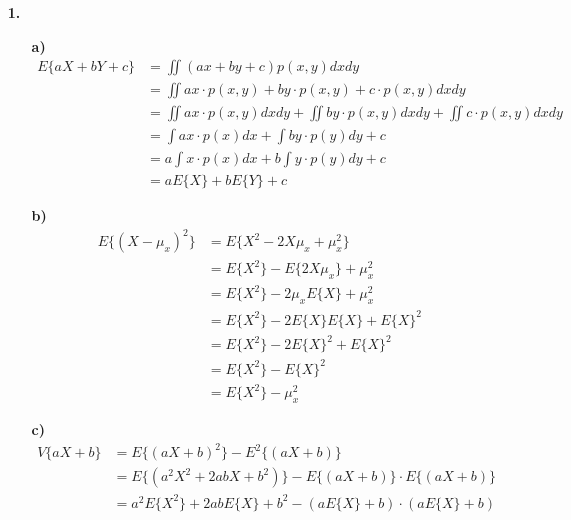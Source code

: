 \documentclass[a4paper,11pt]{article}
\author{\authorinfotitle}
\title{\titleinfo}
\date{\today}
\begin{document}
	\maketitle
	\begin{enumerate}
		\item[\textbf{1.}]
		
		\begin{enumerate}
		\item[\textbf{a)}]
		\begin{align*}
		E\lbrace aX+bY+c\rbrace &= \iint (ax+by+c)p(x,y)dxdy\\
				   &= \iint ax \cdot p(x,y) + by \cdot p(x,y) + c \cdot p(x,y) dxdy\\
				   &= \iint ax \cdot p(x,y) dxdy + \iint by \cdot p(x,y) dxdy + \iint c \cdot p(x,y) dxdy\\
				  &= \int ax \cdot p(x) dx + \int by \cdot p(y) dy +  c\\ 
				  &= a\int x \cdot p(x) dx + b\int y \cdot p(y) dy +  c\\ 
				  &= aE\lbrace X\rbrace + bE\lbrace Y\rbrace +  c
		\end{align*}
		\item[\textbf{b)}]
		\begin{align*}
		E\lbrace (X-\mu_x)^2\rbrace &= E\lbrace X^2-2X\mu_x + \mu^2_x\rbrace \\
							  		&= E\lbrace X^2\rbrace-E\lbrace 2X\mu_x \rbrace + \mu^2_x\\
							  		&= E\lbrace X^2\rbrace-2\mu_x E\lbrace X \rbrace + \mu^2_x\\				
							  		&= E\lbrace X^2\rbrace-2 E\lbrace X \rbrace E\lbrace X \rbrace + E\lbrace X \rbrace^2\\			
							  		&= E\lbrace X^2\rbrace-2 E\lbrace X \rbrace^2 + E\lbrace X \rbrace^2\\				
							  		&= E\lbrace X^2\rbrace- E\lbrace X \rbrace^2 \\					  						&= E\lbrace X^2\rbrace- \mu_x^2
		\end{align*}
		\item[\textbf{c)}]
		\begin{align*}
		V\lbrace aX + b \rbrace &= E\lbrace (aX + b)^2 \rbrace - E^2\lbrace (aX + b) \rbrace \\
		&= E\lbrace (a^2X^2 + 2abX + b^2) \rbrace - E\lbrace (aX + b) \rbrace \cdot
		E\lbrace (aX + b) \rbrace \\
		&= a^2E\lbrace X^2 \rbrace + 2abE\lbrace X \rbrace + b^2 - (aE\lbrace X \rbrace + b) \cdot (aE\lbrace X \rbrace + b) \\

\end{align*}
\end{enumerate}
\end{enumerate}
\end{document}
